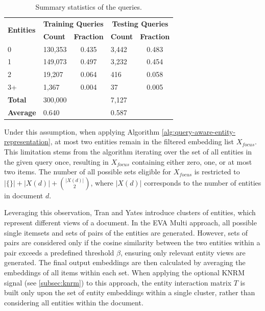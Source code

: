 \begin{table}[!htb]
    \centering
    \small
    \begin{tabular}{lp{2cm}cp{2cm}c}
    \hline
    \multirow{2}{*}{\textbf{Entities}} & \multicolumn{2}{c}{\textbf{Training Queries}} & \multicolumn{2}{c}{\textbf{Testing Queries}} \\
                                 & \textbf{Count}           & \textbf{Fraction}          & \textbf{Count}           & \textbf{Fraction}          \\
    \hline
    0 & 130,353 & 0.435 & 3,442 & 0.483 \\
    1 & 149,073 & 0.497 & 3,232 & 0.454 \\
    2 & 19,207 & 0.064 & 416 & 0.058 \\
    3+ & 1,367 & 0.004 & 37 & 0.005 \\
    \hline
    \textbf{Total} & 300,000 &  & 7,127 &  \\
    \textbf{Average} & 0.640 &  & 0.587 &  \\
    \hline
    \end{tabular}
    \caption{Summary statistics of the queries.}
    \label{tab:query_statistics}
\end{table}

Under this assumption, when applying Algorithm \ref{alg:query-aware-entity-representation}, at most two entities remain in the filtered embedding list $X_{focus}$. This limitation stems from the algorithm iterating over the set of all entities in the given query once, resulting in $X_{focus}$ containing either zero, one, or at most two items. The number of all possible sets eligible for $X_{focus}$ is restricted to $|\{\}| + |X(d)| + \binom{|X(d)|}{2}$, where $|X(d)|$ corresponds to the number of entities in document $d$.

Leveraging this observation, Tran and Yates introduce clusters of entities, which represent different views of a document. In the EVA Multi approach, all possible single itemsets and sets of pairs of the entities are generated. However, sets of pairs are considered only if the cosine similarity between the two entities within a pair exceeds a predefined threshold $\beta$, ensuring only relevant entity views are generated. The final output embeddings are then calculated by averaging the embeddings of all items within each set. When applying the optional KNRM signal (see \autoref{subsec:knrm}) to this approach, the entity interaction matrix $T$ is built only upon the set of entity embeddings within a single cluster, rather than considering all entities within the document.

